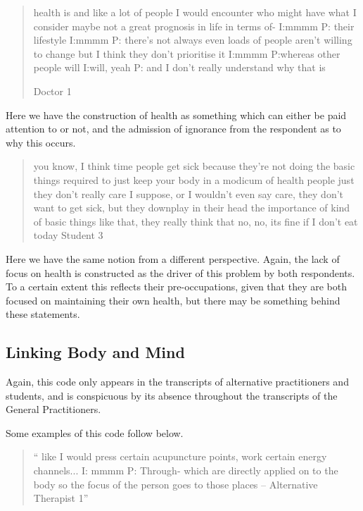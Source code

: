 \begin{quotation}
  health is and like a lot of people I would encounter who might have what I consider maybe not a great prognosis in life in terms of-
I:mmmm
P: their lifestyle 
I:mmmm
P: there's not always even loads of people aren't willing to change but I think they don't prioritise it 
I:mmmm
P:whereas other people will 
I:will, yeah
P: and I don't really understand why that is 

Doctor 1
\end{quotation}
Here we have the construction of health as something which can either be paid attention to or not, and the admission of ignorance from the respondent as to why this occurs. 

\begin{quotation}
  you know, I think time people get sick because they're not doing the basic things required to just keep your body in a modicum of health people just they don't really care I suppose, or I wouldn't even say care, they don't want to get sick, but they downplay in their head the importance of kind of basic things like that, they really think that no, no, its fine if I don't eat today
Student 3
\end{quotation}


Here we have the same notion from a different perspective. Again, the lack of focus on health is constructed as the driver of this problem by both respondents. To a certain extent this reflects their pre-occupations, given that they are both focused on maintaining their own health, but there may be something behind these statements. 

\subsection{Linking Body and Mind}

Again, this code only appears in the transcripts of alternative practitioners and students, and is conspicuous by its absence throughout the transcripts of the General Practitioners. 

Some examples of this code follow below. 

\begin{quotation}
`` like I would press certain acupuncture points, work certain energy channels...
I: mmmm
P: Through- which are directly applied on to the body so the focus of the person goes to those places – Alternative Therapist 1''  
\end{quotation}


